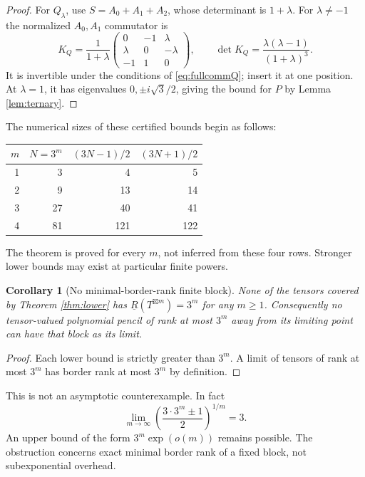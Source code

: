 \documentclass[11pt]{article}
\newtheorem{corollary}[theorem]{Corollary}
\theoremstyle{remark}\newtheorem{remark}[theorem]{Remark}
\newcommand{\BR}{\underline R}
\newcommand{\gp}{\boxtimes}
\begin{document}
\begin{proof}
For $Q_\lambda$, use $S=A_0+A_1+A_2$, whose determinant is $1+\lambda$. For $\lambda\ne-1$ the normalized $A_0,A_1$ commutator is
\begin{equation}\label{eq:KQ}
 K_Q=\frac1{1+\lambda}
 \begin{pmatrix}
 0&-1&\lambda\\
 \lambda&0&-\lambda\\
 -1&1&0
 \end{pmatrix},\qquad
 \det K_Q=\frac{\lambda(\lambda-1)}{(1+\lambda)^3}.
\end{equation}
It is invertible under the conditions of \eqref{eq:fullcommQ}; insert it at one position. At $\lambda=1$, it has eigenvalues $0,\pm i\sqrt3/2$, giving the bound for $P$ by Lemma \ref{lem:ternary}.
\end{proof}

The numerical sizes of these certified bounds begin as follows:
\begin{center}
\begin{tabular}{rrrr}
\toprule
$m$ & $N=3^m$ & $(3N-1)/2$ & $(3N+1)/2$\\
\midrule
1&3&4&5\\2&9&13&14\\3&27&40&41\\4&81&121&122\\
\bottomrule
\end{tabular}
\end{center}
The theorem is proved for every $m$, not inferred from these four rows. Stronger lower bounds may exist at particular finite powers.

\begin{corollary}[No minimal-border-rank finite block]\label{cor:block}
None of the tensors covered by Theorem \ref{thm:lower} has $\BR(T^{\gp m})=3^m$ for any $m\geq1$. Consequently no tensor-valued polynomial pencil of rank at most $3^m$ away from its limiting point can have that block as its limit.
\end{corollary}
\begin{proof}
Each lower bound is strictly greater than $3^m$. A limit of tensors of rank at most $3^m$ has border rank at most $3^m$ by definition.
\end{proof}

This is not an asymptotic counterexample. In fact
\[
 \lim_{m\to\infty}\left(\frac{3\cdot3^m\pm1}{2}\right)^{1/m}=3.
\]
An upper bound of the form $3^m\exp(o(m))$ remains possible. The obstruction concerns exact minimal border rank of a fixed block, not subexponential overhead.
\end{document}
